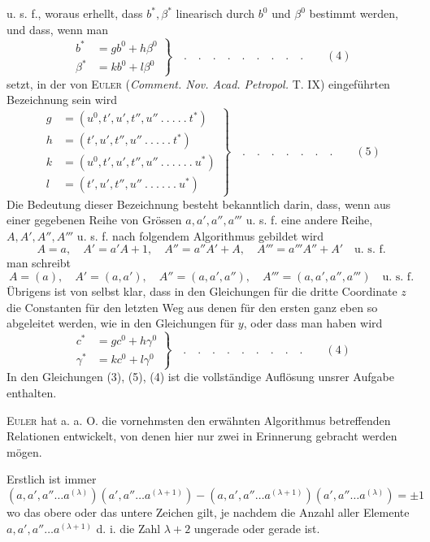 u. s. f., woraus erhellt, dass $b^*,\beta^*$ linearisch durch $b^0$ und $\beta^0$ bestimmt werden, und dass, wenn man
\[
\left.\begin{aligned}
b^*&=gb^0+h\beta^0\\
\beta^*&=kb^0+l\beta^0
\end{aligned}\right\}\quad .\quad .\quad .\quad .\quad .\quad .\quad .\quad .\quad .\qquad (4)
\]
setzt, in der von \textsc{Euler} (\textit{Comment. Nov. Acad. Petropol.} T. IX) eingeführten Bezeichnung sein wird
\[
\left.\begin{aligned}
g&=(u^0,t',u',t'',u''\ .\ .\ .\ .\ .\ t^*)\\
h&=(t',u',t'',u''\ .\ .\ .\ .\ .\ t^*)\\
k&=(u^0,t',u',t'',u''\ .\ .\ .\ .\ .\ .\ u^*)\\
l&=(t',u',t'',u''\ .\ .\ .\ .\ .\ .\ u^*)
\end{aligned}\right\}\quad .\quad .\quad .\quad .\quad .\quad .\quad .\qquad (5)
\]
Die Bedeutung dieser Bezeichnung besteht bekanntlich darin, dass, wenn aus einer gegebenen Reihe von Grössen $a,a',a'',a'''$ u. s. f. eine andere Reihe, $A,A',A'',A'''$ u. s. f. nach folgendem Algorithmus gebildet wird
\[
A=a,\quad A'=a'A+1,\quad A''=a''A'+A,\quad A'''=a'''A''+A'\quad\text{u. s. f.}
\]
man schreibt
\[
A=(a),\quad A'=(a,a'),\quad A''=(a,a',a''),\quad A'''=(a,a',a'',a''')\quad\text{u. s. f.}
\]
Übrigens ist von selbst klar, dass in den Gleichungen für die dritte Coordinate $z$ die Constanten für den letzten Weg aus denen für den ersten ganz eben so abgeleitet werden, wie in den Gleichungen für $y$, oder dass man haben wird
\[
\left.\begin{aligned}
c^*&=gc^0+h\gamma^0\\
\gamma^*&=kc^0+l\gamma^0
\end{aligned}\right\}\quad .\quad .\quad .\quad .\quad .\quad .\quad .\quad .\quad .\qquad (4)
\]
In den Gleichungen (3), (5), (4) ist die vollständige Auflösung unsrer Aufgabe enthalten.

\textsc{Euler} hat a. a. O. die vornehmsten den erwähnten Algorithmus betreffenden Relationen entwickelt, von denen hier nur zwei in Erinnerung gebracht werden mögen.

Erstlich ist immer
\[
(a,a',a''\ldots a^{(\lambda)})(a',a''\ldots a^{(\lambda+1)})-(a,a',a''\ldots a^{(\lambda+1)})(a',a''\ldots a^{(\lambda)})=\pm1
\]
wo das obere oder das untere Zeichen gilt, je nachdem die Anzahl aller Elemente $a,a',a''\ldots a^{(\lambda+1)}$ d. i. die Zahl $\lambda+2$ ungerade oder gerade ist.

